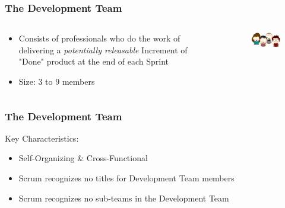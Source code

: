 \begin{frame}
	\frametitle{The Development Team}
	
	\begin{columns}
		\begin{column}{0.6\textwidth}
			\begin{itemize}
        		\setlength\itemsep{0.7em}
        		\item Consists of professionals who do the work of delivering a \textit{potentially releasable} Increment of "Done" product at the end of each Sprint 
        		\item Size: 3 to 9 members
        	\end{itemize}
		\end{column}
		\begin{column}{0.4\textwidth}
		    \vspace{-2em}
			\begin{figure}
                \includegraphics[width=2.4in]{images/devteam.jpg}
            \end{figure}
		\end{column}
	\end{columns}
\end{frame}

\begin{frame}
	\frametitle{The Development Team}
	Key Characteristics:
	\vspace{1em}
	\begin{itemize}
		\setlength\itemsep{0.7em}
		\item<1-> Self-Organizing \& Cross-Functional
		\item<1-> Scrum recognizes no titles for Development Team members
		\item<1-> Scrum recognizes no sub-teams in the Development Team
	\end{itemize}
\end{frame}

